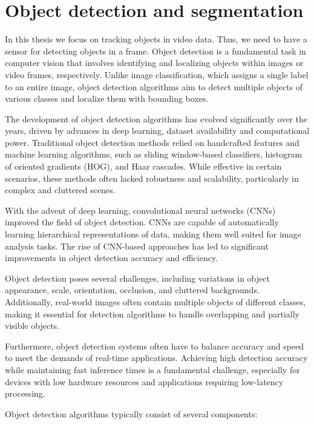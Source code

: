 \chapter{Object detection and segmentation}
In this thesis we focus on tracking objects in video data. Thus, we need to have a sensor for detecting objects in a
frame. Object detection is a fundamental task in computer vision that involves identifying and localizing objects
within images or video frames, respectively. Unlike image classification, which assigns a single label to an entire
image, object
detection algorithms aim to detect multiple objects of various classes and localize them with bounding boxes.

The development of object detection algorithms has evolved significantly over the years, driven by advances in deep
learning, dataset availability and computational power. Traditional object detection methods relied on handcrafted
features and machine learning algorithms, such as sliding window-based classifiers, histogram of oriented gradients (HOG), and Haar cascades. While effective in certain scenarios, these methods often lacked robustness and scalability, particularly in complex and cluttered scenes.

With the advent of deep learning, convolutional neural networks (CNNs) improved the field of object detection. CNNs are
capable of automatically learning hierarchical representations of data, making them well suited for image analysis
tasks. The rise of CNN-based approaches has led to significant improvements in object detection accuracy and efficiency.

Object detection poses several challenges, including variations in object appearance, scale, orientation, occlusion, and cluttered backgrounds. Additionally, real-world images often contain multiple objects of different classes, making it essential for detection algorithms to handle overlapping and partially visible objects.

Furthermore, object detection systems often have to balance accuracy and speed to meet the demands of real-time
applications. Achieving high detection accuracy while maintaining fast inference times is a fundamental challenge,
especially for devices with low hardware resources and applications requiring low-latency processing.

Object detection algorithms typically consist of several components:

